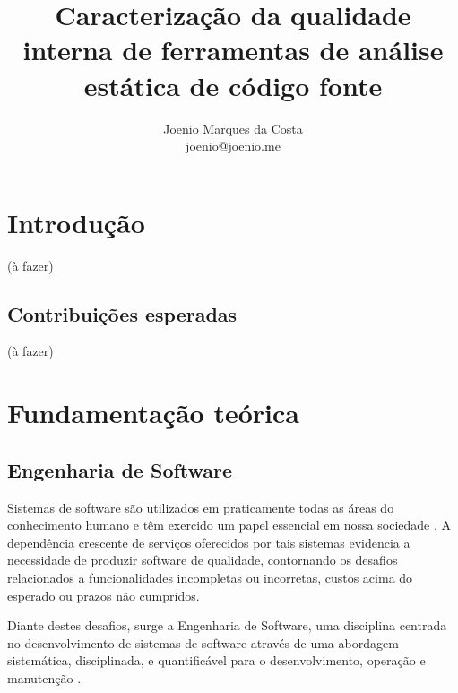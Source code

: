 \documentclass[qual, classic, a4paper]{ufbathesis}
\title{
  Caracterização da qualidade interna de ferramentas de análise estática de
  código fonte
}
\author{Joenio Marques da Costa\\
  {\small joenio@joenio.me}
}
\begin{document}
\frontpage
\frontmatter
\presentationpage

%
%
%
%

\tableofcontents
\listoffigures
\listoftables
\mainmatter

\chapter{Introdução}

(à fazer)


\section{Contribuições esperadas}

(à fazer)

\chapter{Fundamentação teórica}

\section{Engenharia de Software}

Sistemas de software são utilizados em praticamente todas as áreas do
conhecimento humano e têm exercido um papel essencial em nossa sociedade
\cite{Mafra2006}. A dependência crescente de serviços oferecidos por tais
sistemas evidencia a necessidade de produzir software de qualidade,
contornando os  desafios relacionados a funcionalidades incompletas ou
incorretas, custos acima do esperado ou prazos não cumpridos.

Diante destes desafios, surge a Engenharia de Software, uma disciplina
centrada no desenvolvimento de sistemas de software através
de uma abordagem sistemática, disciplinada, e quantificável para o
desenvolvimento, operação e manutenção \cite{SWEBOK2014}.
\end{document}

